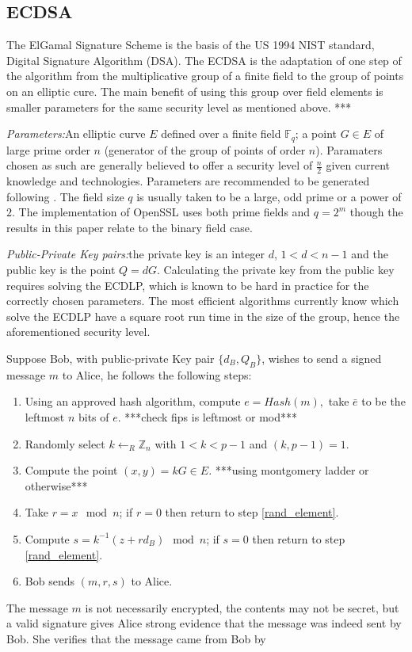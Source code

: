 \documentclass{llncs}
\newcommand{\F}{{\mathbb F}}
\newcommand{\Z}{{\mathbb Z}}
\begin{document}
\subsection{ECDSA}\label{sub:ecdsa}

The ElGamal Signature Scheme is the basis of the US 1994 NIST standard, Digital Signature Algorithm (DSA). The ECDSA is the adaptation of one step of the algorithm from the multiplicative group of a finite field to the group of points on an elliptic cure. The main benefit of using this group over field elements is smaller parameters for the same security level as mentioned above. ***

\emph{Parameters:}\quad An elliptic curve $E$ defined over a finite field $\F_{q}$; a point $G\in E$ of large prime order $n$ (generator of the group of points of order $n$). Paramaters chosen as such are generally believed to offer a security level of $\frac{n}{2}$ given current knowledge and technologies. Parameters are recommended to be generated following \cite{fips}. The field size $q$ is usually taken to be a large, odd prime or a power of $2$. The implementation of OpenSSL uses both prime fields and $q=2^m$ though the results in this paper relate to the binary field case.

\emph{Public-Private Key pairs:}\quad the private key is an integer $d$, $1<d<n-1$ and the public key is the point $Q=dG$. Calculating the private key from the public key requires solving the ECDLP, which is known to be hard in practice for the correctly chosen parameters. The most efficient algorithms currently know which solve the ECDLP have a square root run time in the size of the group, hence the aforementioned security level.
\vspace{0.5cm}

Suppose Bob, with public-private Key pair $\{d_B,Q_B\}$, wishes to send a signed message $m$ to Alice, he follows the following steps:
\begin{enumerate}
\item Using an approved hash algorithm, compute $e=Hash(m),$ take $\bar{e}$ to be the leftmost $n$ bits of $e$. ***check fips is leftmost or mod***
\item\label{rand_element} Randomly select $k\leftarrow_R\Z_n$ with $1<k<p-1$ and $(k,p-1)=1$.
\item Compute the point $(x,y)=kG\in E$. ***using montgomery ladder or otherwise***
\item Take $r=x\mod n$; if $r=0$ then return to step \ref{rand_element}.
\item Compute $s=k^{-1}(z+rd_B)\mod n$; if $s=0$ then return to step \ref{rand_element}.
\item Bob sends $(m,r,s)$ to Alice.
\end{enumerate}
The message $m$ is not necessarily encrypted, the contents may not be secret, but a valid signature gives Alice strong evidence that the message was indeed sent by Bob. She verifies that the message came from Bob by 
\end{document}
